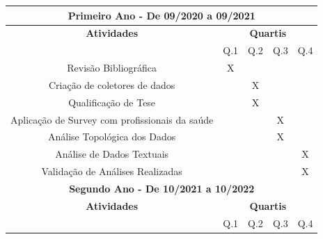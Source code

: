 \documentclass[11pt, notitlepage]{article} %
\begin{document}
\begin{table}[!ht]
  \centering
  \begin{tabular}{cllll}
  \hline
  \multicolumn{5}{|c|}{\cellcolor[HTML]{C0C0C0}\textbf{\large{Primeiro Ano - De 09/2020 a 09/2021}}} \\ \hline
  \multicolumn{1}{|c|}{\cellcolor[HTML]{C0C0C0}\textbf{Atividades}} & \multicolumn{4}{c|}{\cellcolor[HTML]{C0C0C0}\textbf{Quartis}} \\ \hline
  \multicolumn{1}{|c|}{} & \multicolumn{1}{c|}{Q.1} & \multicolumn{1}{c|}{Q.2} & \multicolumn{1}{c|}{Q.3} & \multicolumn{1}{c|}{Q.4} \\ \hline

  \multicolumn{1}{|c|}{Revisão Bibliográfica} & \multicolumn{1}{c|}{X} & \multicolumn{1}{c|}{} & \multicolumn{1}{c|}{} & \multicolumn{1}{c|}{} \\ \hline
  \multicolumn{1}{|c|}{Criação de coletores de dados} & \multicolumn{1}{c|}{} & \multicolumn{1}{c|}{X} & \multicolumn{1}{c|}{} & \multicolumn{1}{c|}{} \\ \hline
  \multicolumn{1}{|c|}{Qualificação de Tese} & \multicolumn{1}{c|}{} & \multicolumn{1}{c|}{X} & \multicolumn{1}{c|}{} & \multicolumn{1}{c|}{} \\ \hline
  \multicolumn{1}{|c|}{Aplicação de Survey com profissionais da saúde} & \multicolumn{1}{c|}{} & \multicolumn{1}{c|}{} & \multicolumn{1}{c|}{X} & \multicolumn{1}{c|}{} \\ \hline
  \multicolumn{1}{|c|}{Análise Topológica dos Dados} & \multicolumn{1}{c|}{} & \multicolumn{1}{c|}{} & \multicolumn{1}{c|}{X} & \multicolumn{1}{c|}{} \\ \hline
    \multicolumn{1}{|c|}{Análise de Dados Textuais} & \multicolumn{1}{c|}{} & \multicolumn{1}{c|}{} & \multicolumn{1}{c|}{} & \multicolumn{1}{c|}{X} \\ \hline
  \multicolumn{1}{|c|}{Validação de Análises Realizadas} & \multicolumn{1}{c|}{} & \multicolumn{1}{c|}{} & \multicolumn{1}{c|}{} & \multicolumn{1}{c|}{X} \\ \hline
  
  
  \multicolumn{5}{|c|}{\cellcolor[HTML]{C0C0C0}\textbf{\large{Segundo Ano - De 10/2021 a 10/2022}}} \\ \hline
  \multicolumn{1}{|c|}{\cellcolor[HTML]{C0C0C0}\textbf{Atividades}} & \multicolumn{4}{c|}{\cellcolor[HTML]{C0C0C0}\textbf{Quartis}} \\ \hline
  \multicolumn{1}{|c|}{} & \multicolumn{1}{c|}{Q.1} & \multicolumn{1}{c|}{Q.2} & \multicolumn{1}{c|}{Q.3} & \multicolumn{1}{c|}{Q.4} \\ \hline


\end{tabular}
\end{table}
\end{document}
